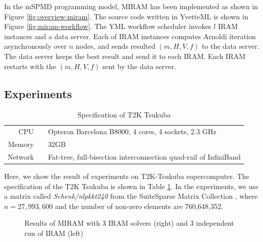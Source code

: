 \documentclass[graybox]{svmult}
\begin{document}
In the mSPMD programming model, MIRAM has been implemented as shown in Figure \ref{fig:overview-miram}. 
The source code written in YvetteML is shown in Figure \ref{fig:miram-workflow}. 
The YML workflow scheduler invokes $l$ IRAM instances and a data server. 
Each of IRAM instances computes Arnoldi iteration asynchronously over $n$ nodes, and sends 
resulted $(m, H, V, f)$ to the data server.  
The data server keeps the best result and send it to each IRAM. Each IRAM restarts with the $(m, H, V, f)$ sent by the data server. 

\subsection{Experiments}


\begin{table}[t]
\begin{center}
 \caption{Specification of T2K Tsukuba}
 \label{table:t2k-spec}
\begin{tabular}[t]{rrl}\hline\hline
 CPU & & Opteron Barcelona B8000, 4 cores, 4 sockets, 2.3 GHz\\
Memory && 32GB\\
Network & & Fat-tree, full-bisection interconnection quad-rail of InfiniBand\\\hline
\end{tabular}
\end{center}
\end{table}

Here, we show the result of experiments on T2K-Tsukuba supercomputer. The specification of the T2K Tsukuba is shown in Table \ref{table:t2k-spec}. 
In the experiments, we use a matrix called {\it Schenk/nlpkkt240} from the SuiteSparse Matrix Collection \cite{matrix-collection}, where $n=27,993,600$ and the number of non-zero elements are  760,648,352. 


\begin{figure}[t]
 \begin{center}
  \caption{Results of MIRAM with 3 IRAM solvers (right) and 3 independent run of IRAM (left)}
  \label{figure:result-miram}
 \end{center}
\end{figure}
\end{document}
